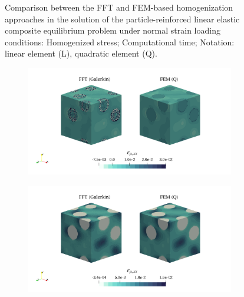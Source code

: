 \begin{figure}[hbt]
\begin{subfigure}[b]{0.49\textwidth}
      \caption{}
      \label{subfig:linear_3D_normal_stress_avg_cpu_time_vs_n_voxels}
    \end{subfigure}
  \caption{Comparison between the FFT and FEM-based homogenization approaches in the solution
  of the particle-reinforced linear elastic composite equilibrium problem under normal strain
  loading conditions:  Homogenized
  stress;  Computational time;
  Notation: linear element (L), quadratic element (Q).}
\label{fig:linear_3D_normal_stiff_contrast}
\end{figure}

\begin{figure}[hbt]
  \centering
	\begin{subfigure}[b]{\textwidth}
    \centering
    \includegraphics[width=\textwidth]{figures/linear_3D_ratio_-4_normal_strain_11}
    \caption{}
    \label{subfig:linear_3D_ratio_-4_normal_strain_11}
  \end{subfigure}
  \begin{subfigure}[b]{\textwidth}
    \centering
    \includegraphics[width=\textwidth]{figures/linear_3D_ratio_1_5_normal_strain_11}

\end{subfigure}
\end{figure}
